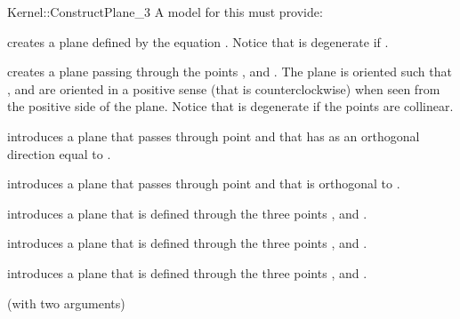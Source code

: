 \begin{ccRefFunctionObjectConcept}{Kernel::ConstructPlane_3}
A model for this must provide:


{creates a plane  defined by the equation
 .
Notice that  is degenerate if .}

{creates a plane  passing through the points ,
  and . The plane is oriented such that , 
  and  are oriented in a positive sense 
 (that is counterclockwise) when seen from the positive side of the plane.
Notice that  is degenerate if the points are collinear.}


{introduces a plane  that passes through point  and
 that has as an orthogonal direction equal to .}

{introduces a plane that passes through point  and
 that is orthogonal to .}

{introduces a plane  that is defined through the  three points 
 ,  and .}

{introduces a plane  that is defined through the  three points 
 ,  and .}

{introduces a plane  that is defined through the  three points 
 ,  and .}

\ccRefines
{} (with two arguments)

\ccSeeAlso
{} \\

\end{ccRefFunctionObjectConcept}

